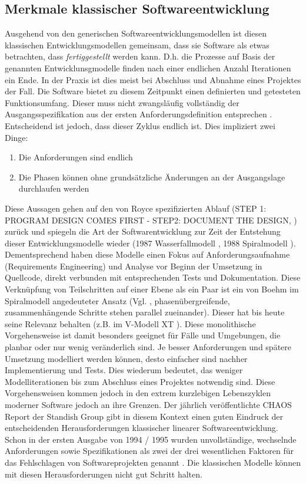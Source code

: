 \subsection{Merkmale klassischer Softwareentwicklung}
\label{Merkmale klassischer Softwareentwicklung}
Ausgehend von den generischen Softwareentwicklungsmodellen ist diesen klassischen Entwicklungsmodellen gemeinsam, dass sie Software als etwas betrachten, dass \textit{fertiggestellt} werden kann. D.h. die Prozesse auf Basis der genannten Entwicklunsgmodelle finden nach einer endlichen Anzahl Iterationen ein Ende. In der Praxis ist dies meist bei Abschluss und Abnahme eines Projektes der Fall. Die Software bietet zu diesem Zeitpunkt einen definierten und getesteten Funktionsumfang. Dieser muss nicht zwangsläufig vollständig der Ausgangsspezifikation aus der ersten Anforderungsdefinition entsprechen \cite[Kap. 9.2]{Manfred_Marko_PM_2013}. Entscheidend ist jedoch, dass dieser Zyklus endlich ist. Dies impliziert zwei Dinge: 
\begin{enumerate}
	\item Die Anforderungen sind endlich
	\item Die Phasen können ohne grundsätzliche Änderungen an der Ausgangslage durchlaufen werden
\end{enumerate}
Diese Aussagen gehen auf den von Royce spezifizierten Ablauf (\glqq{}STEP 1: PROGRAM DESIGN COMES FIRST - STEP2: DOCUMENT THE DESIGN\grqq{}, \cite{royce1987managing}) zurück und spiegeln die Art der Softwarentwicklung zur Zeit der Entstehung dieser Entwicklungsmodelle wieder (1987 Wasserfallmodell \cite{royce1987managing}, 1988 Spiralmodell \cite{boehm_spiral_1988}).
Dementsprechend haben diese Modelle einen Fokus auf Anforderungsaufnahme (\gls{Requirements Engineering}) und Analyse vor Beginn der Umsetzung in Quellcode, direkt verbunden mit entsprechenden Tests und Dokumentation. Diese Verknüpfung von Teilschritten auf einer Ebene als ein Paar ist ein von Boehm im Spiralmodell angedeuteter Ansatz (Vgl. \cite[Abb. 2]{boehm_spiral_1988}, phasenübergreifende, zusammenhängende Schritte stehen parallel zueinander). Dieser hat bis heute seine Relevanz behalten (z.B. im V-Modell XT \cite{noauthor_bundesregierung_nodate}). Diese monolithische Vorgehensweise ist damit besonders geeignet für Fälle und Umgebungen, die planbar oder nur wenig veränderlich sind. Je besser Anforderungen und spätere Umsetzung modelliert werden können, desto einfacher sind nachher Implementierung und Tests. Dies wiederum bedeutet, das weniger Modelliterationen bis zum Abschluss eines Projektes notwendig sind.
Diese Vorgehensweisen kommen jedoch in den extrem kurzlebigen Lebenszyklen moderner Software jedoch an ihre Grenzen. Der jährlich veröffentlichte CHAOS Report der Standish Group gibt in diesem Kontext einen guten Eindruck der entscheidenden Herausforderungen klassischer linearer Softwareentwicklung. Schon in der ersten Ausgabe von 1994 / 1995 \cite{noauthor_standish_1995} wurden unvollständige, wechselnde Anforderungen sowie Spezifikationen als zwei der drei wesentlichen Faktoren für das Fehlschlagen von Softwareprojekten genannt  \cite[S. 4]{noauthor_standish_1995}.
Die klassischen Modelle können mit diesen Herausforderungen nicht gut Schritt halten.